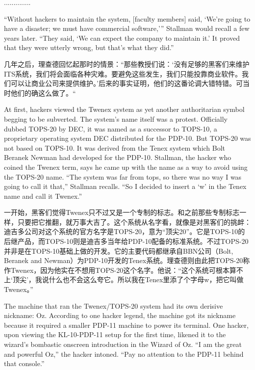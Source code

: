 \ifdefined\chs
..............
\fi

\ifdefined\eng
``Without hackers to maintain the system, [faculty members] said, `We're going to have a disaster; we must have commercial software,'\hspace{0.01in}'' Stallman would recall a few years later. ``They said, `We can expect the company to maintain it.' It proved that they were utterly wrong, but that's what they did.''
\fi

\ifdefined\chs
几年之后，理查德回忆起那时的情景：``那些教授们说：`没有足够的黑客们来维护ITS系统，我们将会面临各种灾难。要避免这些发生，我们只能投靠商业软件。我们可以让商业公司来提供维护。'后来的事实证明，他们的这番论调大错特错。可当时他们的确这么做了。``
\fi

\ifdefined\eng
At first, hackers viewed the Twenex system as yet another authoritarian symbol begging to be subverted. The system's name itself was a protest. Officially dubbed TOPS-20 by DEC, it was named as a successor to TOPS-10, a proprietary operating system DEC distributed for the PDP-10. But TOPS-20 was not based on TOPS-10.  It was derived from the Tenex system which Bolt Beranek Newman had developed for the PDP-10. Stallman, the hacker who coined the Twenex term, says he came up with the name as a way to avoid using the TOPS-20 name. ``The system was far from tops, so there was no way I was going to call it that,'' Stallman recalls. ``So I decided to insert a `w' in the Tenex name and call it Twenex.''
\fi

\ifdefined\chs
一开始，黑客们觉得Twenex只不过又是一个专制的标志。和之前那些专制标志一样，只要把它推翻，就万事大吉了。这个系统从名字看，就像是对黑客们的挑衅：迪吉多公司对这个系统的官方名字是TOPS-20，意为``顶尖20''。它是TOPS-10的后继产品，而TOPS-10则是迪吉多当年给PDP-10配备的标准系统。不过TOPS-20并非是在TOPS-10基础上做的开发。它的主要代码都继承自BBN公司（Bolt, Beranek and Newman）为PDP-10开发的Tenex系统。理查德则由此把TOPS-20称作Twenex，因为他实在不想用TOPS-20这个名字。他说：``这个系统可根本算不上`顶尖'，我说什么也不会这么夸它。所以我在Tenex里添了个字母w，把它叫做Twenex。''
\fi

\ifdefined\eng
The machine that ran the Twenex/TOPS-20 system had its own derisive nickname: Oz. According to one hacker legend, the machine got its nickname because it required a smaller PDP-11 machine to power its terminal. One hacker, upon viewing the KL-10-PDP-11 setup for the first time, likened it to the wizard's bombastic onscreen introduction in the Wizard of Oz. ``I am the great and powerful Oz,'' the hacker intoned. ``Pay no attention to the PDP-11 behind that console.''
\fi

